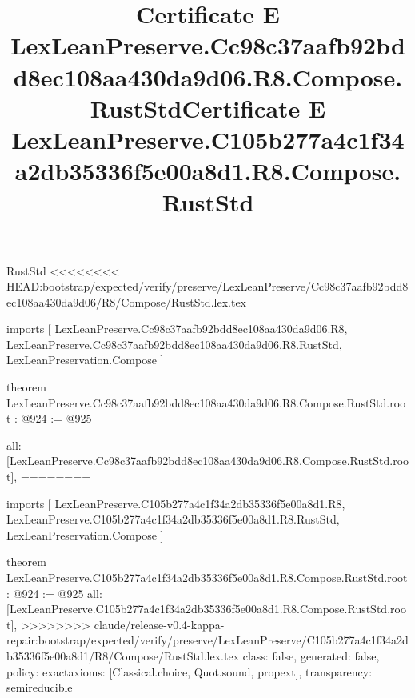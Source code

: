 \begin{lexlean}{RustStd}
<<<<<<<< HEAD:bootstrap/expected/verify/preserve/LexLeanPreserve/Cc98c37aafb92bdd8ec108aa430da9d06/R8/Compose/RustStd.lex.tex
\title{Certificate E LexLeanPreserve.Cc98c37aafb92bdd8ec108aa430da9d06.R8.Compose.RustStd}
\begin{coremodule}
imports [
  LexLeanPreserve.Cc98c37aafb92bdd8ec108aa430da9d06.R8,
  LexLeanPreserve.Cc98c37aafb92bdd8ec108aa430da9d06.R8.RustStd,
  LexLeanPreservation.Compose
]

theorem LexLeanPreserve.Cc98c37aafb92bdd8ec108aa430da9d06.R8.Compose.RustStd.root : @924 := @925 {
  all: [LexLeanPreserve.Cc98c37aafb92bdd8ec108aa430da9d06.R8.Compose.RustStd.root],
========
\title{Certificate E LexLeanPreserve.C105b277a4c1f34a2db35336f5e00a8d1.R8.Compose.RustStd}
\begin{coremodule}
imports [
  LexLeanPreserve.C105b277a4c1f34a2db35336f5e00a8d1.R8,
  LexLeanPreserve.C105b277a4c1f34a2db35336f5e00a8d1.R8.RustStd,
  LexLeanPreservation.Compose
]

theorem LexLeanPreserve.C105b277a4c1f34a2db35336f5e00a8d1.R8.Compose.RustStd.root : @924 := @925 {
  all: [LexLeanPreserve.C105b277a4c1f34a2db35336f5e00a8d1.R8.Compose.RustStd.root],
>>>>>>>> claude/release-v0.4-kappa-repair:bootstrap/expected/verify/preserve/LexLeanPreserve/C105b277a4c1f34a2db35336f5e00a8d1/R8/Compose/RustStd.lex.tex
  class: false,
  generated: false,
  policy: exact{axioms: [Classical.choice, Quot.sound, propext]},
  transparency: semireducible
}


\end{coremodule}}
\end{coremodule}
\end{lexlean}
